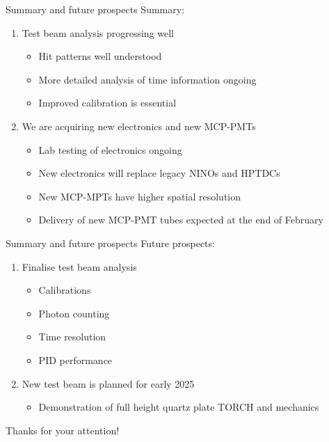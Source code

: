 \documentclass[xcolor={dvipsnames}]{beamer}
\begin{document}
\begin{frame}{Summary and future prospects}
  \vspace{0.3cm}
  {\Large Summary:}
  \vspace{0.5cm}
  \begin{enumerate}
    \setlength\itemsep{1.5em}
    \item{Test beam analysis progressing well}
    \begin{itemize}
      \item{Hit patterns well understood}
      \item{More detailed analysis of time information ongoing}
      \item{Improved calibration is essential}
    \end{itemize}
    \item{We are acquiring new electronics and new MCP-PMTs}
    \begin{itemize}
      \item{Lab testing of electronics ongoing}
      \item{New electronics will replace legacy NINOs and HPTDCs}
      \item{New MCP-MPTs have higher spatial resolution}
      \item{Delivery of new MCP-PMT tubes expected at the end of February}
    \end{itemize}
  \end{enumerate}
\end{frame}

\begin{frame}{Summary and future prospects}
  \vspace{0.3cm}
  {\Large Future prospects:}
  \vspace{0.5cm}
  \begin{enumerate}
    \setlength\itemsep{1.5em}
    \item{Finalise test beam analysis}
    \begin{itemize}
      \item{Calibrations}
      \item{Photon counting}
      \item{Time resolution}
      \item{PID performance}
    \end{itemize}
    \item{New test beam is planned for early 2025}
    \begin{itemize}
      \item{Demonstration of full height quartz plate TORCH and mechanics}
    \end{itemize}
  \end{enumerate}
  \vspace{0.5cm}
  \begin{center}
    {\huge Thanks for your attention!}
  \end{center}
\end{frame}
\end{document}
